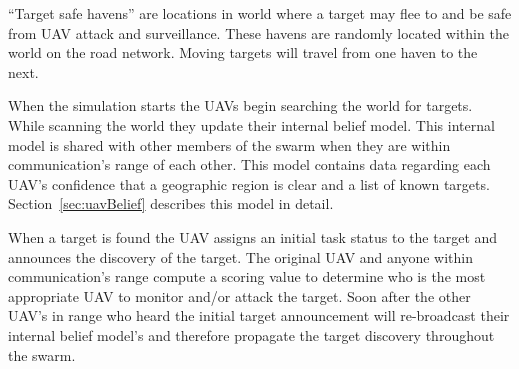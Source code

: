 ``Target safe havens'' are locations in world where a target may flee to and be safe from UAV attack and surveillance.  These havens are randomly located within the world on the road network.  Moving targets will travel from one haven to the next.

When the simulation starts the UAVs begin searching the world for targets.  While scanning the world they update their internal belief model.  This internal model is shared with other members of the swarm when they are within communication's range of each other.  This model contains data regarding each UAV's confidence that a geographic region is clear and a list of known targets.  Section~\ref{sec:uavBelief} describes this model in detail.

When a target is found the UAV assigns an initial task status to the target and announces the discovery of the target.  The original UAV and anyone within communication's range compute a scoring value to determine who is the most appropriate UAV to monitor and/or attack the target.  Soon after the other UAV's in range who heard the initial target announcement will re-broadcast their internal belief model's and therefore propagate the target discovery throughout the swarm.

